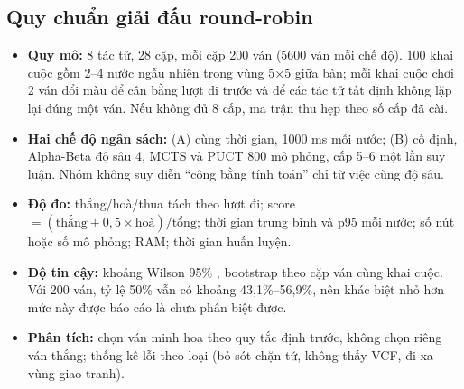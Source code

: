 \documentclass[12pt,a4paper]{report}
\newenvironment{gon}{\begin{itemize}\setlength{\itemsep}{2pt}\setlength{\parskip}{0pt}}{\end{itemize}}
\begin{document}
\subsection{Quy chuẩn giải đấu round-robin}
\begin{gon}
  \item \textbf{Quy mô:} 8 tác tử, 28 cặp, mỗi cặp 200 ván (\num{5600} ván mỗi chế độ). 100 khai cuộc gồm 2--4 nước ngẫu nhiên trong vùng 5×5 giữa bàn; mỗi khai cuộc chơi 2 ván đổi màu để cân bằng lượt đi trước và để các tác tử tất định không lặp lại đúng một ván. Nếu không đủ 8 cấp, ma trận thu hẹp theo số cấp đã cài.
  \item \textbf{Hai chế độ ngân sách:} (A) cùng thời gian, \num{1000} ms mỗi nước; (B) cố định, Alpha-Beta độ sâu 4, MCTS và PUCT 800 mô phỏng, cấp 5--6 một lần suy luận. Nhóm không suy diễn ``công bằng tính toán'' chỉ từ việc cùng độ sâu.
  \item \textbf{Độ đo:} thắng/hoà/thua tách theo lượt đi; score $= (\text{thắng} + 0{,}5 \times \text{hoà}) / \text{tổng}$; thời gian trung bình và p95 mỗi nước; số nút hoặc số mô phỏng; RAM; thời gian huấn luyện.
  \item \textbf{Độ tin cậy:} khoảng Wilson 95\% \cite{wilson1927}, bootstrap theo cặp ván cùng khai cuộc. Với 200 ván, tỷ lệ 50\% vẫn có khoảng 43,1\%--56,9\%, nên khác biệt nhỏ hơn mức này được báo cáo là chưa phân biệt được.
  \item \textbf{Phân tích:} chọn ván minh hoạ theo quy tắc định trước, không chọn riêng ván thắng; thống kê lỗi theo loại (bỏ sót chặn tứ, không thấy VCF, đi xa vùng giao tranh).
\end{gon}
\end{document}
